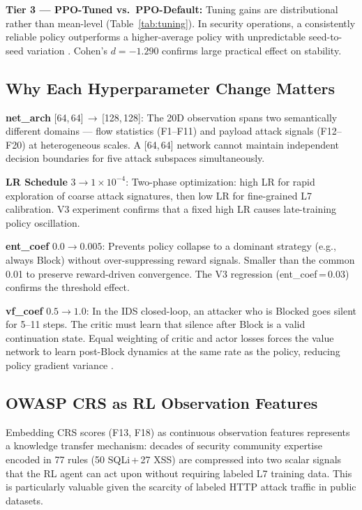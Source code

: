 \documentclass[conference]{IEEEtran}
\begin{document}
\textbf{Tier 3 --- PPO-Tuned vs.\ PPO-Default:} Tuning gains are
distributional rather than mean-level (Table~\ref{tab:tuning}). In security
operations, a consistently reliable policy outperforms a higher-average policy
with unpredictable seed-to-seed variation \cite{henderson2018deeprl}.
Cohen's $d{=}{-1.290}$ confirms large practical effect on stability.

\subsection{Why Each Hyperparameter Change Matters}

\textbf{net\_arch} [64,\,64]\,$\rightarrow$\,[128,\,128]: The 20D
observation spans two semantically different domains --- flow statistics
(F1--F11) and payload attack signals (F12--F20) at heterogeneous scales.
A [64,\,64] network cannot maintain independent decision boundaries for
five attack subspaces simultaneously.

\textbf{LR Schedule} $3{\to}1{\times}10^{-4}$: Two-phase optimization:
high LR for rapid exploration of coarse attack signatures, then low LR
for fine-grained L7 calibration. V3 experiment confirms that a fixed
high LR causes late-training policy oscillation.

\textbf{ent\_coef} $0.0{\to}0.005$: Prevents policy collapse to a dominant
strategy (e.g., always Block) without over-suppressing reward signals.
Smaller than the common 0.01 to preserve reward-driven convergence. The
V3 regression (ent\_coef\,=\,0.03) confirms the threshold effect.

\textbf{vf\_coef} $0.5{\to}1.0$: In the IDS closed-loop, an attacker
who is Blocked goes silent for 5--11 steps. The critic must learn that
silence after Block is a valid continuation state. Equal weighting of
critic and actor losses forces the value network to learn post-Block
dynamics at the same rate as the policy, reducing policy gradient
variance \cite{engstrom2020}.

\subsection{OWASP CRS as RL Observation Features}

Embedding CRS scores (F13, F18) as continuous observation features
represents a knowledge transfer mechanism: decades of security community
expertise encoded in 77 rules (50 SQLi\,+\,27 XSS) are compressed into
two scalar signals that the RL agent can act upon without requiring labeled
L7 training data. This is particularly valuable given the scarcity of
labeled HTTP attack traffic in public datasets.
\end{document}
